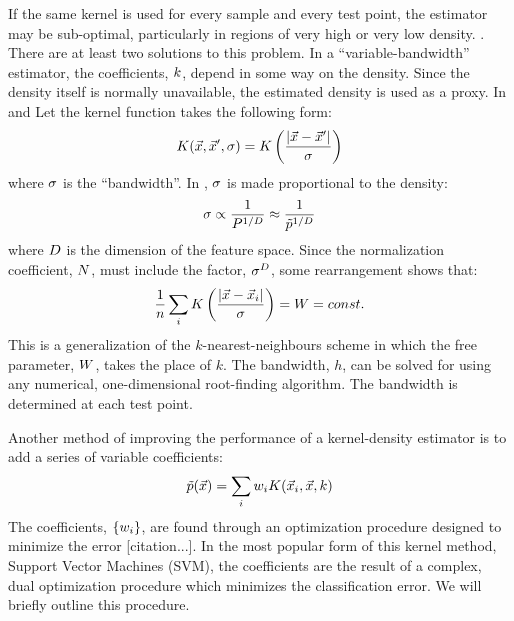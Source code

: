 \documentclass[11pt]{article}
\begin{document}
If the same kernel is used for every sample and every test point, the estimator
may be sub-optimal, particularly in regions of very high or very low density.
\citep{Terrell_Scott1992, Mills2011}.
There are at least two solutions to this problem.
In a ``variable-bandwidth'' estimator, the coefficients, $k$, depend in some
way on the density. Since the density itself is normally unavailable, the
estimated density is used as a proxy. In \citet{Terrell_Scott1992} and
\citet{Mills2011} 
Let the kernel function takes the following form:
\begin{equation}
	K(\vec {x}, \vec {x}^\prime, \sigma) = K \left (\frac{|\vec {x} - \vec {x}^\prime|}{\sigma} \right )
\end{equation}
where $\sigma$ is the ``bandwidth''. 
In \citet{Mills2011}, $\sigma$ is made proportional to the density:
\begin{equation}
	\sigma \propto \frac{1}{P^{1/D}} \approx \frac{1}{\tilde p^{1/D}}
\end{equation}
where $D$ is the dimension of the feature space.
Since the normalization coefficient, $N$, must include the factor,
${\sigma^D}$, some rearrangement shows that:
\begin{equation}
	\frac{1}{n} \sum_i K \left (\frac{|\vec {x} - \vec {x}_i|}{\sigma} \right ) = W = const.
\end{equation}
This is a generalization of the $k$-nearest-neighbours scheme in which the
free parameter, $W$, takes the place of $k$. \citep{Mills2009, Mills2011}
The bandwidth, $h$, can be solved
for using any numerical, one-dimensional root-finding algorithm.
The bandwidth is determined at each test point.

Another method of improving the performance of a kernel-density estimator
is to add a series of variable coefficients:
\begin{equation}
	\tilde p(\vec {x}) = \sum_i w_i K(\vec {x}_i, \vec {x}, k)
\end{equation}
The coefficients, $\lbrace w_i \rbrace$, are found through an optimization
procedure designed to minimize the error [citation...]. In the most popular
form of this kernel method, Support Vector Machines (SVM), the coefficients
are the result of a complex, dual optimization procedure which minimizes
the classification error. We will briefly outline this procedure.
\end{document}
